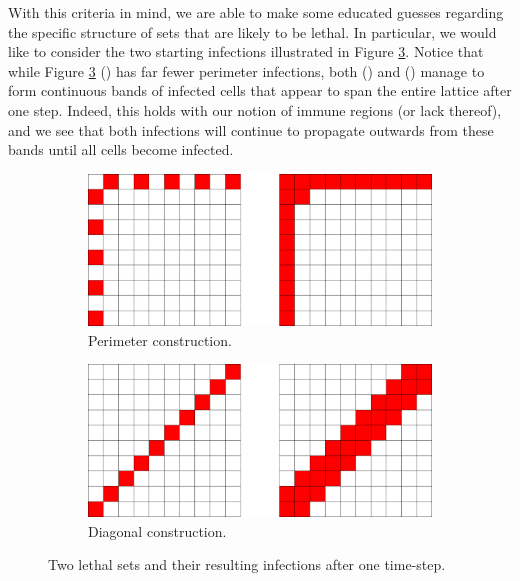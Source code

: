 With this criteria in mind, we are able to make some educated guesses regarding the specific structure of sets that are likely to be lethal. In particular, we would like to consider the two starting infections illustrated in Figure \ref{fig:two_infections}. Notice that while Figure \ref{fig:two_infections} () has far fewer perimeter infections, both () and () manage to form continuous bands of infected cells that appear to span the entire lattice after one step. Indeed, this holds with our notion of immune regions (or lack thereof), and we see that both infections will continue to propagate outwards from these bands until all cells become infected.

\begin{figure}[]
\centering
\begin{subfigure}{0.45\textwidth}
	\includegraphics[width=\textwidth]{figures/1/two_infections_a.pdf}
	\caption{Perimeter construction.}
	\label{fig:two_infections_a}
\end{subfigure} \hfill%
\begin{subfigure}{0.45\textwidth}
	\includegraphics[width=\textwidth]{figures/1/two_infections_b.pdf}
	\caption{Diagonal construction.}
	\label{fig:two_infections_b}
\end{subfigure}
\caption{Two lethal sets and their resulting infections after one time-step.}
\label{fig:two_infections}
\end{figure} 

